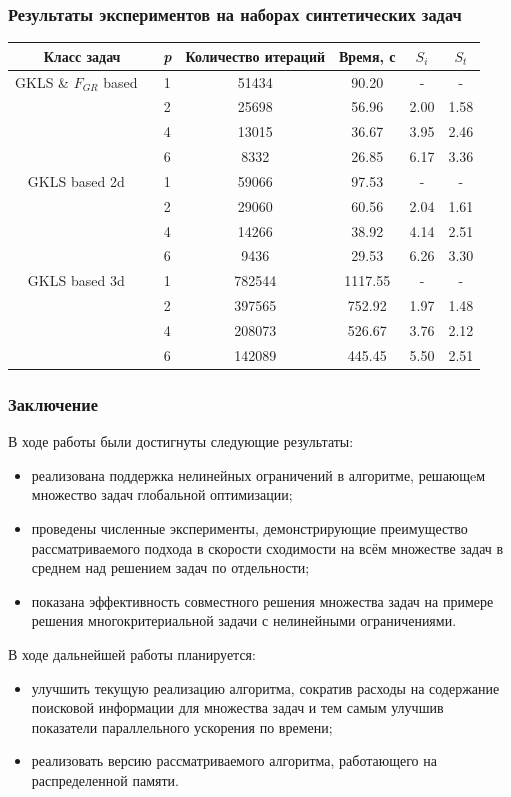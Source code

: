 \documentclass[aspectratio=1610]{beamer}
\begin{document}
\begin{frame}
  \frametitle{Результаты экспериментов на наборах синтетических задач}
  \begin{table}
    \centering
    \begin{tabular}{c|c|c|c|c|c}
      Класс задач & \textit{p} & Количество итераций & Время, с & \(S_i\) & \(S_t\)   \\
      \hline
      GKLS \& \(F_{GR}\) based \
        & 1 & 51434 & 90.20 & -    & - \\
        & 2 & 25698 & 56.96 & 2.00 & 1.58 \\
        & 4 & 13015 & 36.67 & 3.95 & 2.46 \\
        & 6 & 8332  & 26.85 & 6.17 & 3.36 \\
      \hline
      GKLS based 2d \
        & 1 & 59066 & 97.53 & -    & - \\
        & 2 & 29060 & 60.56 & 2.04 & 1.61 \\
        & 4 & 14266 & 38.92 & 4.14 & 2.51 \\
        & 6 & 9436  & 29.53 & 6.26 & 3.30 \\
      \hline
      GKLS based 3d \
        & 1 & 782544 & 1117.55 & -    & - \\
        & 2 & 397565 & 752.92  & 1.97 & 1.48 \\
        & 4 & 208073 & 526.67  & 3.76 & 2.12 \\
        & 6 & 142089 & 445.45  & 5.50 & 2.51 \\
      \hline
    \end{tabular}
  \end{table}
\end{frame}

\begin{frame}
  \frametitle{Заключение}
  В ходе работы были достигнуты следующие результаты:
    \begin{itemize}
      \item реализована поддержка нелинейных ограничений в алгоритме, решающeм
      множество задач глобальной оптимизации;
      \item проведены численные эксперименты, демонстрирующие преимущество рассматриваемого подхода в скорости сходимости на всём множестве задач в среднем над решением задач по отдельности;
      \item показана эффективность совместного решения множества задач на примере решения многокритериальной задачи с нелинейными ограничениями.
    \end{itemize}

    В ходе дальнейшей работы планируется:
    \begin{itemize}
      \item улучшить текущую реализацию алгоритма, сократив расходы на содержание поисковой информации для множества задач и тем самым улучшив
      показатели параллельного ускорения по времени;
      \item реализовать версию рассматриваемого алгоритма, работающего на распределенной памяти.
    \end{itemize}
\end{frame}
\end{document}
